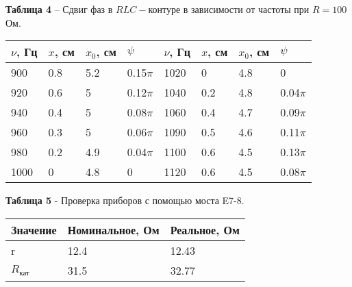 \documentclass[12pt,a4paper]{article}
\begin{document}
\begin{itemize}
            \begin{table}[!h]
            \begin{flushleft}%
           		\textbf{Таблица 4} --  Сдвиг фаз в $RLC-$контуре в зависимости от частоты при $R = 100$ Ом.\\
            \end{flushleft}
                \begin{center}
                    \begin{tabular}{ | l | l | l | l | l | l | l | l |}
                        \hline
                        $\nu$, Гц   &   $x$, см &  $x_0$, см&   $\psi$  &   $\nu$, Гц   &   $x$, см &  $x_0$, см    &   $\psi$  \\
                        \hline
                        900     &   0.8 &   5.2 &   0.15$\pi$   &   1020    &   0   &   4.8 &   0           \\
                        920     &   0.6 &   5   &   0.12$\pi$   &   1040    &   0.2 &   4.8 &   0.04$\pi$  \\
                        940     &   0.4 &   5   &   0.08$\pi$   &   1060    &   0.4 &   4.7 &   0.09$\pi$  \\
                        960     &   0.3 &   5   &   0.06$\pi$   &   1090    &   0.5 &   4.6 &   0.11$\pi$   \\
                        980     &   0.2 &   4.9 &   0.04$\pi$   &   1100    &   0.6 &   4.5 &   0.13$\pi$   \\
                        1000    &   0   &   4.8 &   0           &   1120    &   0.6 &   4.5 &   0.08$\pi$   \\
                        \hline         
                    \end{tabular}
                \end{center}
            \end{table}
        \end{itemize}
    
        \begin{table}[!h]
            \begin{flushleft}%
           		\textbf{Таблица 5} - Проверка приборов с помощью моста E7-8.
            \end{flushleft}
            \begin{center}
                \begin{tabular}{ | l | l | l |}
                    \hline
                    Значение        &   Номинальное, Ом &   Реальное, Ом \\
                    \hline
                    r               &   12.4            &   12.43    \\
                    $R_\text{кат}$  &   31.5            &   32.77    \\
                    \hline                
                \end{tabular}
            \end{center}
        \end{table}
\end{document}
